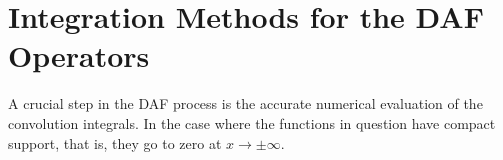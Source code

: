 \section{Integration Methods for the DAF Operators}

A crucial step in the DAF process is the accurate numerical evaluation of the
convolution integrals. In the case where the functions in question have 
compact support, that is, they go to zero at $x\to\pm\infty$. 


